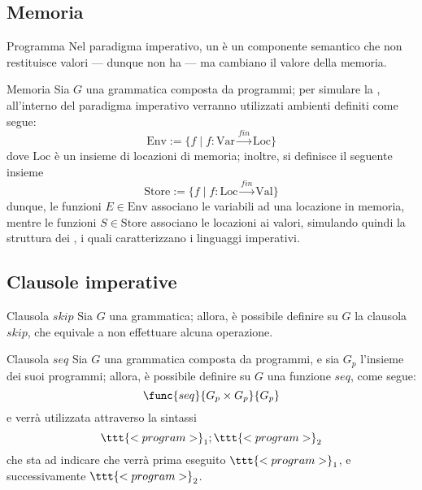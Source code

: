 \documentclass[a4paper, 12pt]{report}
\begin{document}
    \subsection{Memoria}

    \begin{frameddefn}{Programma}
        Nel paradigma imperativo, un  è un componente semantico che non restituisce valori --- dunque non ha  --- ma cambiano il valore della memoria.
    \end{frameddefn}

    \begin{frameddefn}[label={store}]{Memoria}
        Sia $G$ una grammatica composta da programmi; per simulare la , all'interno del paradigma imperativo verranno utilizzati ambienti definiti come segue: $$\mathrm{Env} := \{f \mid f : \mathrm{Var} \xrightarrow{fin} \mathrm{Loc} \}$$ dove $\mathrm{Loc}$ è un insieme di locazioni di memoria; inoltre, si definisce il seguente insieme $$\mathrm{Store} := \{f \mid f : \mathrm{Loc} \xrightarrow{fin} \mathrm{Val} \}$$ dunque, le funzioni $E \in \mathrm{Env}$ associano le variabili ad una locazione in memoria, mentre le funzioni $S \in \mathrm{Store}$ associano le locazioni ai valori, simulando quindi la struttura dei , i quali caratterizzano i linguaggi imperativi.
    \end{frameddefn}

    \subsection{Clausole imperative}

    \begin{frameddefn}{Clausola $skip$}
        Sia $G$ una grammatica; allora, è possibile definire su $G$ la clausola $skip$, che equivale a non effettuare alcuna operazione.
    \end{frameddefn}
    
    \begin{frameddefn}{Clausola $seq$}
        Sia $G$ una grammatica composta da programmi, e sia $G_p$ l'insieme dei suoi programmi; allora, è possibile definire su $G$ una funzione $seq$, come segue: $$\func{seq}{G_p \times G_p}{G_p}$$ e verrà utilizzata attraverso la sintassi $$\ttt{<program>}_1;\ttt{<program>}_2$$ che sta ad indicare che verrà prima eseguito $\ttt{<program>}_1$, e successivamente $\ttt{<program>}_2$.
    \end{frameddefn}
\end{document}
